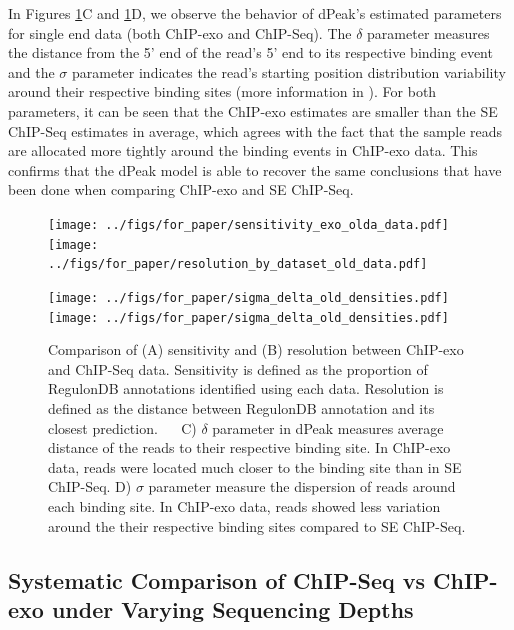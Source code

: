 \documentclass[11pt]{article}\usepackage[]{graphicx}\usepackage[]{color}
\begin{document}
In Figures \ref{fig:reso_all}C and \ref{fig:reso_all}D, we observe the
behavior of dPeak's estimated parameters for single end data (both
ChIP-exo and ChIP-Seq). The $\delta$ parameter measures the distance
from the 5' end of the read's 5' end to its respective binding event
and the $\sigma$ parameter indicates the read's starting position
distribution variability around their respective binding sites (more
information in \cite{dpeak}). For both parameters, it can be seen that
the ChIP-exo estimates are smaller than the SE ChIP-Seq estimates in
average, which agrees with the fact that the sample reads are
allocated more tightly around the binding events in ChIP-exo
data. This confirms that the dPeak model is able to recover the same
conclusions that have been done when comparing ChIP-exo and SE
ChIP-Seq.

\begin{figure}[H]
  \centering
  \texttt{[image: ../figs/for\_paper/sensitivity\_exo\_olda\_data.pdf]}
  \texttt{[image: ../figs/for\_paper/resolution\_by\_dataset\_old\_data.pdf]}
\end{figure}

\begin{figure}[H]
\centering
   \texttt{[image: ../figs/for\_paper/sigma\_delta\_old\_densities.pdf]}
   \texttt{[image: ../figs/for\_paper/sigma\_delta\_old\_densities.pdf]} 

   \caption{Comparison of (A) sensitivity and (B) resolution between
     ChIP-exo and ChIP-Seq data. Sensitivity is defined as the
     proportion of RegulonDB annotations identified using each
     data. Resolution is defined as the distance between RegulonDB
     annotation and its closest prediction. $\quad$ C) $\delta$ parameter in
     dPeak measures average distance of the reads to their respective
     binding site. In ChIP-exo data, reads were located much closer to
     the binding site than in SE ChIP-Seq. D) $\sigma$ parameter
     measure the dispersion of reads around each binding site. In
     ChIP-exo data, reads showed less variation around the their
     respective binding sites compared to SE ChIP-Seq.}
  \label{fig:reso_all}
\end{figure}

\subsection{Systematic Comparison of ChIP-Seq vs ChIP-exo under
  Varying Sequencing Depths}
\label{sec:reco}
\end{document}
